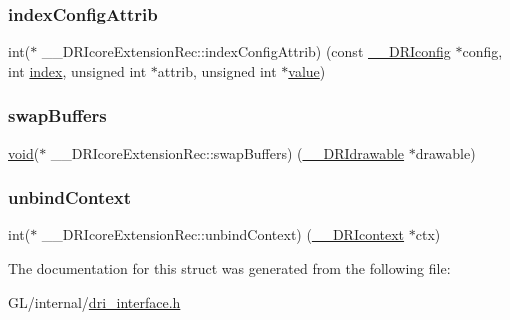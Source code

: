 \mbox{\label{struct_____d_r_icore_extension_rec_aa32e6df7cd0c50578903c9dd78aba59e}} 
\subsubsection{\texorpdfstring{index\+Config\+Attrib}{indexConfigAttrib}}
{\footnotesize\ttfamily int($\ast$ \+\_\+\+\_\+\+D\+R\+Icore\+Extension\+Rec\+::index\+Config\+Attrib) (const \hyperlink{dri__interface_8h_aeac81999efbbf8b1d6886338e3ea24d9}{\+\_\+\+\_\+\+D\+R\+Iconfig} $\ast$config, int \hyperlink{glcorearb_8h_a57f14e05b1900f16a2da82ade47d0c6d}{index}, unsigned int $\ast$attrib, unsigned int $\ast$\hyperlink{glcorearb_8h_a8ad81492d410ff2ac11f754f4042150f}{value})}

\mbox{\label{struct_____d_r_icore_extension_rec_addec4bfd74138870a2ff1a75239e0bc2}} 
\subsubsection{\texorpdfstring{swap\+Buffers}{swapBuffers}}
{\footnotesize\ttfamily \hyperlink{_s_d_l__opengles2__gl2ext_8h_ae5d8fa23ad07c48bb609509eae494c95}{void}($\ast$ \+\_\+\+\_\+\+D\+R\+Icore\+Extension\+Rec\+::swap\+Buffers) (\hyperlink{dri__interface_8h_a5bfb832a0a08208d95b3bbef439d2262}{\+\_\+\+\_\+\+D\+R\+Idrawable} $\ast$drawable)}

\mbox{\label{struct_____d_r_icore_extension_rec_a04850b3ee32c27c78b8efac1aeeb98b6}} 
\subsubsection{\texorpdfstring{unbind\+Context}{unbindContext}}
{\footnotesize\ttfamily int($\ast$ \+\_\+\+\_\+\+D\+R\+Icore\+Extension\+Rec\+::unbind\+Context) (\hyperlink{dri__interface_8h_a3fd295cba82b5a3d79f1ee7e12bfb908}{\+\_\+\+\_\+\+D\+R\+Icontext} $\ast$ctx)}



The documentation for this struct was generated from the following file\+:\begin{DoxyCompactItemize}
\item 
G\+L/internal/\hyperlink{dri__interface_8h}{dri\+\_\+interface.\+h}\end{DoxyCompactItemize}
